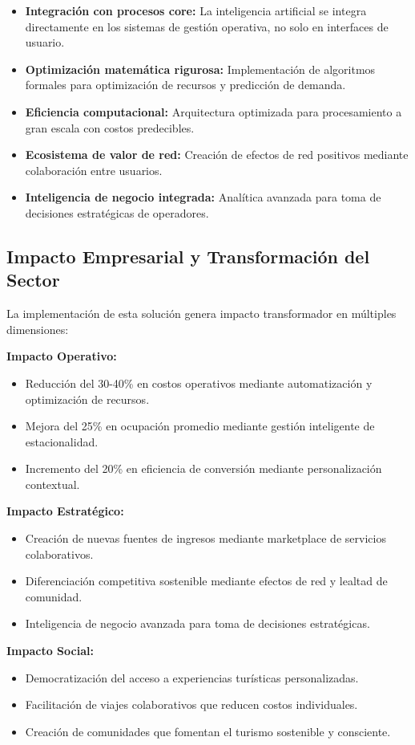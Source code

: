 \documentclass[12pt, letterpaper]{article}
\begin{document}
\begin{itemize}
\item \textbf{Integración con procesos core:} La inteligencia artificial se integra directamente en los sistemas de gestión operativa, no solo en interfaces de usuario.
\item \textbf{Optimización matemática rigurosa:} Implementación de algoritmos formales para optimización de recursos y predicción de demanda.
\item \textbf{Eficiencia computacional:} Arquitectura optimizada para procesamiento a gran escala con costos predecibles.
\item \textbf{Ecosistema de valor de red:} Creación de efectos de red positivos mediante colaboración entre usuarios.
\item \textbf{Inteligencia de negocio integrada:} Analítica avanzada para toma de decisiones estratégicas de operadores.
\end{itemize}

\subsection*{Impacto Empresarial y Transformación del Sector}

La implementación de esta solución genera impacto transformador en múltiples dimensiones:

\textbf{Impacto Operativo:}
\begin{itemize}
\item Reducción del 30-40\% en costos operativos mediante automatización y optimización de recursos.
\item Mejora del 25\% en ocupación promedio mediante gestión inteligente de estacionalidad.
\item Incremento del 20\% en eficiencia de conversión mediante personalización contextual.
\end{itemize}

\textbf{Impacto Estratégico:}
\begin{itemize}
\item Creación de nuevas fuentes de ingresos mediante marketplace de servicios colaborativos.
\item Diferenciación competitiva sostenible mediante efectos de red y lealtad de comunidad.
\item Inteligencia de negocio avanzada para toma de decisiones estratégicas.
\end{itemize}

\textbf{Impacto Social:}
\begin{itemize}
\item Democratización del acceso a experiencias turísticas personalizadas.
\item Facilitación de viajes colaborativos que reducen costos individuales.
\item Creación de comunidades que fomentan el turismo sostenible y consciente.
\end{itemize}
\end{document}
